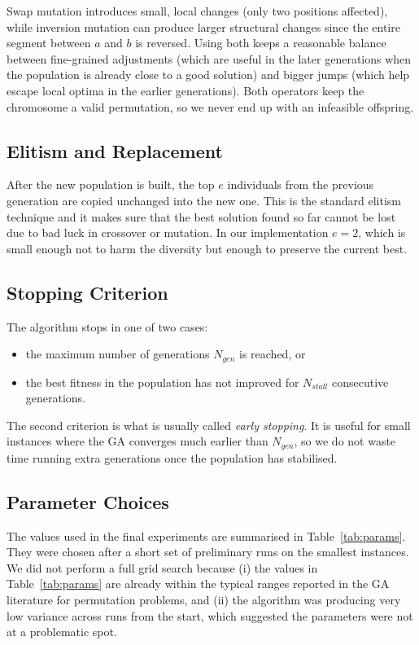 \documentclass [a4paper, 11pt, titlepage] {article}
\begin{document}
Swap mutation introduces small, local changes (only two positions affected), while inversion mutation can produce larger structural changes since the entire segment between $a$ and $b$ is reversed. Using both keeps a reasonable balance between fine-grained adjustments (which are useful in the later generations when the population is already close to a good solution) and bigger jumps (which help escape local optima in the earlier generations). Both operators keep the chromosome a valid permutation, so we never end up with an infeasible offspring.

\subsection{Elitism and Replacement}
\label{sec:elitism}

After the new population is built, the top $e$ individuals from the previous generation are copied unchanged into the new one. This is the standard elitism technique and it makes sure that the best solution found so far cannot be lost due to bad luck in crossover or mutation. In our implementation $e = 2$, which is small enough not to harm the diversity but enough to preserve the current best.

\subsection{Stopping Criterion}
\label{sec:stopping}

The algorithm stops in one of two cases:

\begin{itemize}
    \item the maximum number of generations $N_{gen}$ is reached, or
    \item the best fitness in the population has not improved for $N_{stall}$ consecutive generations.
\end{itemize}

The second criterion is what is usually called \emph{early stopping}. It is useful for small instances where the GA converges much earlier than $N_{gen}$, so we do not waste time running extra generations once the population has stabilised.

\subsection{Parameter Choices}
\label{sec:params}

The values used in the final experiments are summarised in Table~\ref{tab:params}. They were chosen after a short set of preliminary runs on the smallest instances. We did not perform a full grid search because (i) the values in Table~\ref{tab:params} are already within the typical ranges reported in the GA literature for permutation problems, and (ii) the algorithm was producing very low variance across runs from the start, which suggested the parameters were not at a problematic spot.
\end{document}
